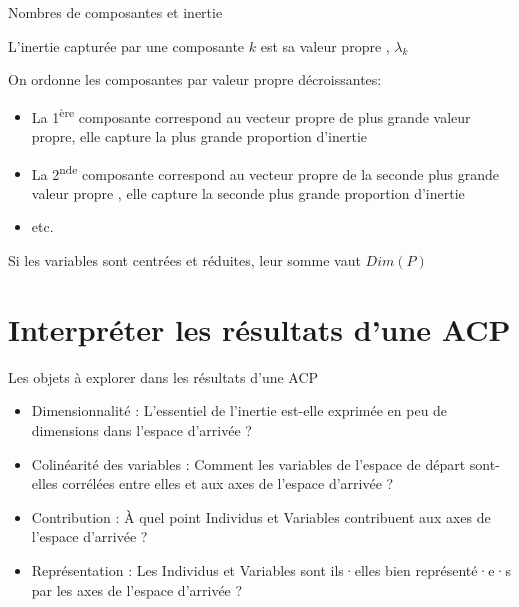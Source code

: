\documentclass{beamer}
\begin{document}
\begin{frame}{Nombres de composantes et inertie}


L'\alert{inertie capturée} par une composante $k$ est sa valeur propre , \alert{$\lambda_k$}

On ordonne les composantes par valeur propre décroissantes:


\begin{small}
\begin{itemize}
  \setlength\itemsep{-0.0em}
\item La 1\textsuperscript{ère} composante correspond au vecteur propre de plus grande valeur propre, elle capture la plus grande proportion d'inertie

\item La 2\textsuperscript{nde} composante correspond au  vecteur propre de la seconde plus grande valeur propre , elle capture la seconde plus grande proportion d'inertie 
\item etc.
\end{itemize}
\end{small}
\medskip

\medskip


Si les variables sont centrées et réduites, leur somme vaut $Dim(P)$ 

\end{frame}




\section{Interpréter les résultats d'une ACP}


\begin{frame}{Les objets à explorer dans les résultats d'une ACP}


\begin{itemize}
  \item \alert{Dimensionnalité} : L'essentiel de l'inertie est-elle exprimée en peu de dimensions dans l'espace d'arrivée ? 
  \item \alert{Colinéarité des variables} : Comment les variables de l'espace de départ sont-elles corrélées entre elles et aux axes de l'espace d'arrivée ? 
  \item \alert{Contribution} : À quel point Individus et Variables  contribuent aux axes de l'espace d'arrivée ?
  \item \alert{Représentation} : Les Individus et Variables sont ils·elles bien représenté·e·s  par les axes de l'espace d'arrivée ?

\end{itemize}



\end{frame}
\end{document}
